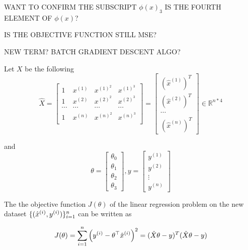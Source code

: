 \begin{answer}

WANT TO CONFIRM THE SUBSCRIPT $\phi (x)_{3}$ IS THE FOURTH ELEMENT OF $\phi (x)$?

IS THE OBJECTIVE FUNCTION STILL MSE?

NEW TERM? BATCH GRADIENT DESCENT ALGO?


Let $X$ be the following
\begin{equation*}
	\hat{X} = \left[\begin{matrix}
	    1 & x^{(1)} & x^{(1)}^2 & x^{(1)}^3 \\
            1 & x^{(2)} & x^{(2)}^2 & x^{(2)}^3 \\
            \cdots & \cdots & \cdots & \cdots \\
            1 & x^{(n)} & x^{(n)}^2 & x^{(n)}^3 \\
	\end{matrix} \right] = \left[\begin{matrix} (\hat{x}^{(1)})^T \\ (\hat{x}^{(2)})^T \\ 
 \cdots \\ (\hat{x}^{(n)})^T  \end{matrix} \right] \in  
 \mathbb{R}^{n*4}
\end{equation*}

and 
\begin{equation*}
	\theta = \left[\begin{array}{c} \theta_0\\ \theta_1 \\ \theta_2 \\ \theta_3 \end{array}\right],  y = \left[\begin{array}{c} y^{(1)} \\ y^{(2)}\\ \vdots \\ y^{(n)} \end{array}\right]
\end{equation*}

The the objective function $J(\theta)$ of the linear regression problem on the new dataset $\{(\hat{x}^{(i)}, y^{(i)})\}_{i=1}^{{n}}$ can be written as 

\begin{equation*}
	J(\theta) = \sum_{i=1}^{n} \left( y^{(i)} - \theta ^\top \hat{x}^{(i)}\right) ^ 2 = (\hat{X} \theta - y)^T(\hat{X} \theta - y)
\end{equation*}


\end{answer}
